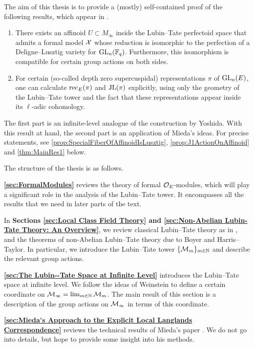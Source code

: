 \documentclass[../main.tex]{subfiles}
\begin{document}
The aim of this thesis is to provide a (mostly) self-contained proof of
the following results, which appear in \cite[Section 5]{mieda2016geometric}. 
\begin{thm*}
  \leavevmode \begin{enumerate}
    \item There exists an affinoid $U \subset M_\infty$ inside the Lubin--Tate perfectoid space that admits a formal model $\mathcal{X}$ whose reduction is isomorphic to the
      perfection of a Deligne--Lusztig variety for $\operatorname{GL}_n(\mathbb{F}_q)$. Furthermore,
      this isomorphism is compatible for certain group actions on both sides.
    \item For certain (so-called depth zero supercuspidal) representations $\pi$ of $\operatorname{GL}_n(E)$, one can calculate $\mathrm{rec}_E(\pi)$ and $\mathrm{JL}(\pi)$
      explicitly, using only the geometry of the Lubin--Tate tower and the fact that these representations appear inside its $\ell$-adic cohomology.
  \end{enumerate}
\end{thm*}
The first part is an infinite-level analogue of the construction by Yoshida.
With this result at hand, the second part is an application of Mieda's ideas.
For precise statements, see \cref{prop:SpecialFiberOfAffinoidIsLusztig},
\cref{prop:J1ActionOnAffinoid} and \cref{thm:MainRes1} below. 

The structure of the thesis is as follows.

\textbf{\cref{sec:FormalModules}} reviews the theory of formal $\mathcal{O}_E$-modules, which
will play a significant role in the analysis of the Lubin--Tate tower. It encompasses
all the results that we need in later parts of the text.

In \textbf{Sections \ref{sec:Local Class Field Theory}  and \ref{sec:Non-Abelian Lubin-Tate Theory: An Overview}}, we review classical Lubin--Tate theory as in
\cite{LubinTateFormalMult}, and the theorems of non-Abelian Lubin--Tate theory
due to Boyer and Harris--Taylor. In particular,
we introduce the Lubin--Tate tower $\{\mathcal{M}_m\}_{m \in \mathbb{N}}$ and describe the
relevant group actions.

\textbf{\cref{sec:The Lubin--Tate Space at Infinite Level}} introduces the
Lubin--Tate space at infinite level. 
We follow the ideas of Weinstein to define a certain coordinate on $\mathcal{M}_\infty = 
\lim_{m \in \mathbb{N}} \mathcal{M}_m$. The main result of this section is a description of
the group actions on $\mathcal{M}_\infty$ in terms of this coordinate. 

\textbf{\cref{sec:Mieda's Approach to the Explicit Local Langlands
Correspondence}} reviews the technical results of Mieda's paper
\cite{mieda2016geometric}. We do not go into details, but hope to provide some
insight into his methods. 
\end{document}

